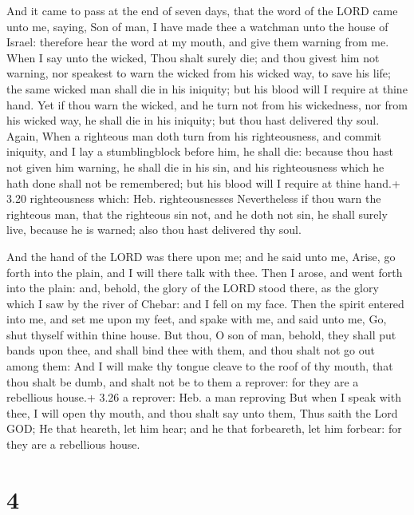  And it came to pass at the end of seven days, that the
word of the LORD came unto me, saying,  Son of man, I have
made thee a watchman unto the house of Israel: therefore hear the word
at my mouth, and give them warning from me.  When I say
unto the wicked, Thou shalt surely die; and thou givest him not warning,
nor speakest to warn the wicked from his wicked way, to save his life;
the same wicked man shall die in his iniquity; but his blood will I
require at thine hand.  Yet if thou warn the wicked, and he
turn not from his wickedness, nor from his wicked way, he shall die in
his iniquity; but thou hast delivered thy soul.  Again,
When a righteous man doth turn from his righteousness, and commit
iniquity, and I lay a stumblingblock before him, he shall die: because
thou hast not given him warning, he shall die in his sin, and his
righteousness which he hath done shall not be remembered; but his blood
will I require at thine hand.+ 3.20 righteousness which: Heb.
righteousnesses  Nevertheless if thou warn the righteous
man, that the righteous sin not, and he doth not sin, he shall surely
live, because he is warned; also thou hast delivered thy soul.

 And the hand of the LORD was there upon me; and he said
unto me, Arise, go forth into the plain, and I will there talk with
thee.  Then I arose, and went forth into the plain: and,
behold, the glory of the LORD stood there, as the glory which I saw by
the river of Chebar: and I fell on my face.  Then the
spirit entered into me, and set me upon my feet, and spake with me, and
said unto me, Go, shut thyself within thine house.  But
thou, O son of man, behold, they shall put bands upon thee, and shall
bind thee with them, and thou shalt not go out among them: 
And I will make thy tongue cleave to the roof of thy mouth, that thou
shalt be dumb, and shalt not be to them a reprover: for they are a
rebellious house.+ 3.26 a reprover: Heb. a man reproving 
But when I speak with thee, I will open thy mouth, and thou shalt say
unto them, Thus saith the Lord GOD; He that heareth, let him hear; and
he that forbeareth, let him forbear: for they are a rebellious house.

\hypertarget{section-3}{%
\section{4}\label{section-3}}

